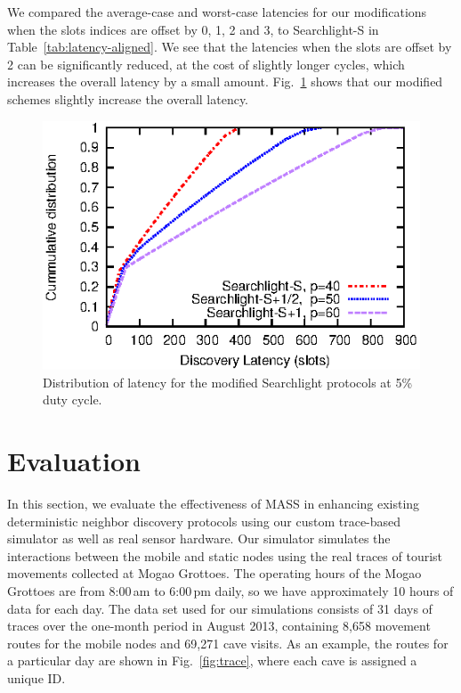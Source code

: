 \documentclass[twoside,twocolumn]{article}
\begin{document}
We compared the average-case and worst-case latencies for our
modifications when the slots indices are offset by 0, 1, 2 and 3, to
Searchlight-S in Table~\ref{tab:latency-aligned}.  We see that the
latencies when the slots are offset by 2 can be significantly reduced,
at the cost of slightly longer cycles, which increases the overall
latency by a small amount. Fig.~\ref{fig:searchlight-cdf} shows that
our modified schemes slightly increase the overall latency.

\begin{figure}[t]
   \centering
   \includegraphics{graphs/analysis/searchlight-cdf}
   \caption{Distribution of latency for the modified Searchlight
          protocols at 5\% duty cycle.}
   \label{fig:searchlight-cdf}
\end{figure}


\section{Evaluation}
\label{sec:eval}

In this section, we evaluate the effectiveness of MASS in enhancing
existing deterministic neighbor discovery protocols using our custom
trace-based simulator as well as real sensor hardware.  Our simulator simulates the interactions
between the mobile and static nodes using the real traces of tourist
movements collected at Mogao Grottoes.  The operating hours of the
Mogao Grottoes are from 8:00\,am to 6:00\,pm daily, so we have
approximately 10 hours of data for each day.  The data set used for
our simulations consists of 31 days of traces over the one-month
period in August 2013, containing 8,658 movement routes for the mobile
nodes and 69,271 cave visits.  As an example, the routes for a
particular day are shown in Fig.~\ref{fig:trace}, where each cave is
assigned a unique ID.
\end{document}
